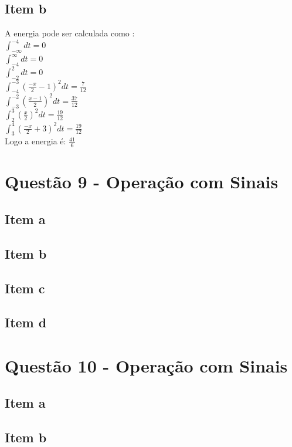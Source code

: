 \documentclass[a4paper, 12pt]{article}
\begin{document}
        \subsection{Item b}    
        A energia pode ser calculada como :\\
        $\int_{-\infty}^{-4}dt = 0$\\
        $\int_{-4}^{\infty}dt = 0$\\
        $\int_{-2}^{2}dt = 0$ \\
        $\int_{-4}^{-3}(\frac{-x}{2} -1)^{2} dt = \frac{7}{12}$ \\
        $\int_{-3}^{-2}(\frac{x-1}{2})^{2} dt = \frac{37}{12}$ \\
        $\int_{2}^{3}(\frac{x}{2})^{2} dt = \frac{19}{12}$ \\
        $\int_{3}^{4}(\frac{-x}{2} +3 )^{2} dt = \frac{19}{12}$ \\        
        Logo a energia é: $\frac{41}{6}$        
    \section{Quest\~{a}o 9 - Operação com Sinais}
        \subsection{Item a}
        \subsection{Item b}
        \subsection{Item c}
        \subsection{Item d}
    \section{Quest\~{a}o 10 - Operação com Sinais}
        \subsection{Item a}
        \subsection{Item b}
\end{document}
